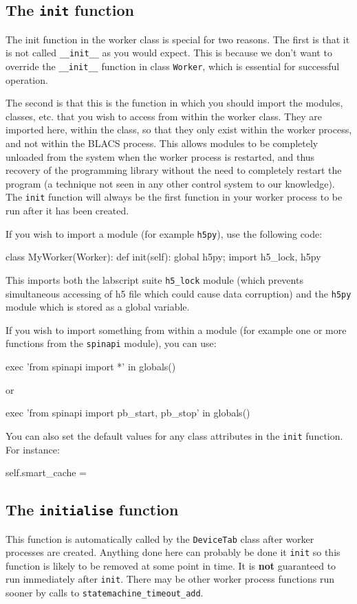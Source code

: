 \documentclass[12pt]{article}
\begin{document}
\subsection{The \texttt{init} function}
The init function in the worker class is special for two reasons. 
The first is that it is not called \texttt{\_\_init\_\_} as you would expect. 
This is because we don't want to override the \texttt{\_\_init\_\_} function in class \texttt{Worker},  which is essential for successful operation.

The second is that this is the function in which you should import the modules, classes, etc. that you wish to access from within the worker class. 
They are imported here, within the class, so that they only exist within the worker process, and not within the BLACS process. 
This allows modules to be completely unloaded from the system when the worker process is restarted, and thus recovery of the programming library without the need to completely restart the program (a technique not seen in any other control system to our knowledge).
The \texttt{{init}} function will always be the first function in your worker process to be run after it has been created.

If you wish to import a module (for example \texttt{h5py}), use the following code:
\begin{python}
class MyWorker(Worker):
    def init(self):
        global h5py; import h5_lock, h5py
\end{python}
This imports both the labscript suite \texttt{h5\_lock} module (which prevents simultaneous accessing of h5 file which could cause data corruption) and the \texttt{h5py} module which is stored as a global variable.

If you wish to import something from within a module (for example one or more functions from the \texttt{spinapi} module), you can use:
\begin{python}
        exec 'from spinapi import *' in globals()
\end{python}
or
\begin{python}
        exec 'from spinapi import pb_start, pb_stop' in globals()
\end{python}

You can also set the default values for any class attributes in the \texttt{init} function. For instance:
\begin{python}
        self.smart_cache = {}
\end{python}

\subsection{The \texttt{initialise} function}
This function is automatically called by the \texttt{DeviceTab} class after worker processes are created. 
Anything done here can probably be done it \texttt{init} so this function is likely to be removed at some point in time.
It is \textbf{not} guaranteed to run immediately after \texttt{init}.
There may be other worker process functions run sooner by calls to \texttt{statemachine\_timeout\_add}.
\end{document}
